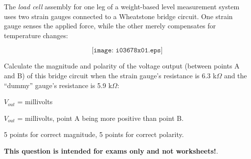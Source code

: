 

The {\it load cell} assembly for one leg of a weight-based level measurement system uses two strain gauges connected to a Wheatstone bridge circuit.  One strain gauge senses the applied force, while the other merely compensates for temperature changes:

$$\texttt{[image: i03678x01.eps]}$$

Calculate the magnitude and polarity of the voltage output (between points A and B) of this bridge circuit when the strain gauge's resistance is 6.3 k$\Omega$ and the ``dummy'' gauge's resistance is 5.9 k$\Omega$:

\vskip 10pt

$V_{out}$ = \underbar{\hskip 50pt} millivolts







$V_{out}$ =  millivolts, point A being more positive than point B.

\vskip 10pt

5 points for correct magnitude, 5 points for correct polarity.







{\bf This question is intended for exams only and not worksheets!}.


